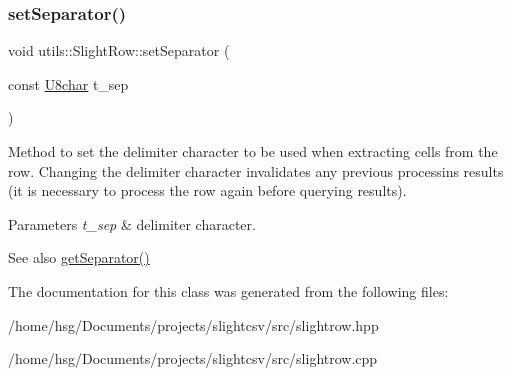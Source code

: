 \subsubsection{\texorpdfstring{set\+Separator()}{setSeparator()}}
{\footnotesize\ttfamily void utils\+::\+Slight\+Row\+::set\+Separator (\begin{DoxyParamCaption}\item[{const \hyperlink{classutils_1_1U8char}{U8char}}]{t\+\_\+sep }\end{DoxyParamCaption})}

Method to set the delimiter character to be used when extracting cells from the row. Changing the delimiter character invalidates any previous processins results (it is necessary to process the row again before querying results). 
\begin{DoxyParams}{Parameters}
{\em t\+\_\+sep} & delimiter character. \\
\hline
\end{DoxyParams}
\begin{DoxySeeAlso}{See also}
\hyperlink{classutils_1_1SlightRow_a413f5dbd5873c2226c62907e854b7328}{get\+Separator()} 
\end{DoxySeeAlso}


The documentation for this class was generated from the following files\+:\begin{DoxyCompactItemize}
\item 
/home/hsg/\+Documents/projects/slightcsv/src/slightrow.\+hpp\item 
/home/hsg/\+Documents/projects/slightcsv/src/slightrow.\+cpp\end{DoxyCompactItemize}

